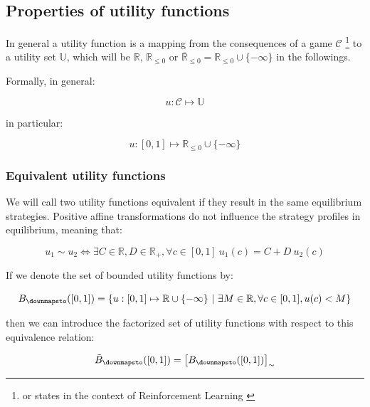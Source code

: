 \documentclass{article}
\theoremstyle{definition}
\begin{document}
\subsection{Properties of utility functions}

In general a utility function is a mapping from the consequences of a game $\mathcal{C}$ \footnote{or states in the context of Reinforcement Learning \cite{book:RL}} to a utility set $\mathbb{U}$, which will be $\mathbb{R}$, $\mathbb{R}_{\le 0}$ or $\overline{\mathbb{R}}_{\le 0} = \mathbb{R}_{\le 0} \cup \{- \infty\}$ in the followings.

Formally, in general:

\begin{equation}
    u : \mathcal{C} \mapsto \mathbb{U}
\end{equation}

in particular:

\begin{equation}
    u : [0,1] \mapsto \mathbb{R}_{\le 0} \cup \{- \infty\}
\end{equation}

\subsubsection{Equivalent utility functions}

We will call two utility functions equivalent if they result in the same equilibrium strategies.
Positive affine transformations do not influence the strategy profiles in equilibrium, meaning that:

\begin{equation}
    u_1 \sim u_2 \iff \exists C \in \mathbb{R}, D \in \mathbb{R}_{+}, \forall c \in [0,1] \ u_1(c) = C + D \ u_2(c)
\end{equation}

If we denote the set of bounded utility functions by:

\begin{equation}
    B_\downmapsto([0,1]) = \{ u : [0,1] \mapsto \mathbb{R} \cup \{-\infty\} \ | \  \exists M \in \mathbb{R}, \forall c \in [0,1],  u(c) < M \}
\end{equation}

then we can introduce the factorized set of utility functions with respect to this equivalence relation:

\begin{equation}
    \tilde{B}_\downmapsto([0,1]) = \left [ B_\downmapsto([0,1]) \right ]_{\sim}
\end{equation}
\end{document}
